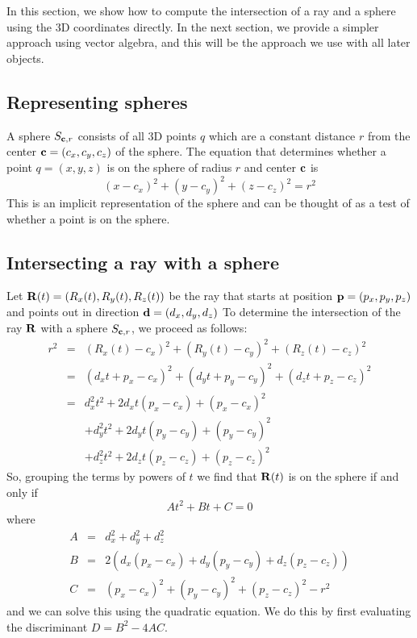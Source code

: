 \documentclass{book}
\newcommand{\vect}[1]{{\bf{ #1}}}
\begin{document}
In this section, we show how to compute the intersection of a ray and a sphere
using the 3D coordinates directly. In the next section, we provide a simpler
approach using vector algebra, and this will be the approach we use with all later
objects.

\subsection{Representing spheres}


A sphere $S_{{\vect c},r}$ consists of all 3D points $q$ which are a constant distance $r$
from the center ${\vect c} = (c_x,c_y,c_z)$ of the sphere. The equation
that determines whether a point $q=(x,y,z)$ is on the sphere of radius
$r$ and center ${\vect c}$ is
\[
(x-c_x)^2 + (y-c_y)^2 + (z-c_z)^2 = r^2
\]
This is an implicit representation of the sphere and can be thought of as
a test of whether a point is on the sphere.

\subsection{Intersecting a ray with a sphere}
Let  $\vect R(t) = (R_x(t), R_y(t),R_z(t))$  be the ray that starts at position $\vect p=(p_x,p_y,p_z)$
and points out in direction $\vect d=(d_x,d_y,d_z)$
To determine the intersection of the ray $\vect R$
with a sphere $S_{{\vect c},r}$, we proceed as follows:
\begin{eqnarray*}
 r^2  &=& (R_x(t)-c_x)^2 + (R_y(t)-c_y)^2 + (R_z(t) - c_z)^2\\
 &=&
   (d_x t + p_x - c_x)^2 + (d_y t + p_y - c_y)^2 + (d_z t + p_z - c_z)^2  \\
 &=& d_x^2 t^2 + 2 d_x t (p_x-c_x) + (p_x-c_x)^2 \\
&& + d_y^2 t^2 + 2 d_y t (p_y-c_y) + (p_y-c_y)^2 \\
&& + d_z^2 t^2 + 2 d_z t (p_z-c_z) + (p_z-c_z)^2
\end{eqnarray*}
So, grouping the terms by powers of $t$ we find that ${\vect R}(t)$ is on
the sphere if and only if
\[
A t^2 + B t + C = 0
\]
where
\begin{eqnarray*}
A &=& d_x^2 + d_y^2 + d_z^2 \\
B &=& 2 (d_x(p_x-c_x) + d_y(p_y-c_y) + d_z(p_z-c_z)) \\
C &=& (p_x-c_x)^2 + (p_y-c_y)^2 + (p_z-c_z)^2 - r^2
\end{eqnarray*}
and we can solve this using the quadratic equation. We do this
by first evaluating the discriminant $D = B^2 - 4 A C$.
\end{document}
